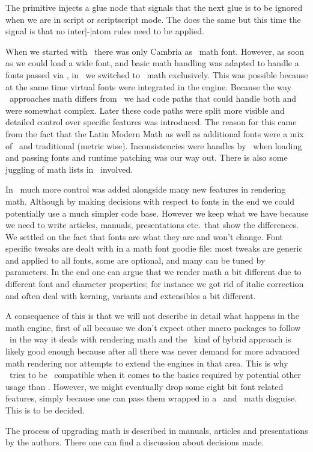 The \type {\nonscript} primitive injects a glue node that signals that the next
glue is to be ignored when we are in script or scriptscript mode. The \typ
{\noatomruling} does the same but this time the signal is that no inter|-|atom
rules need to be applied.

\stopsection

\startsection[title={Fonts}]

When we started with \LUATEX\ there was only Cambria as \OPENTYPE\ math font.
However, as soon as we could load a wide font, and basic math handling was
adapted to handle a fonts passed via \LUA, in \CONTEXT\ we switched to \OPENTYPE\
math exclusively. This was possible because at the same time virtual fonts were
integrated in the engine. Because the way \TEX\ approaches math differs from
\OPENTYPE\ we had code paths that could handle both and were somewhat complex.
Later these code paths were split more visible and detailed control over specific
features was introduced. The reason for this came from the fact that the Latin
Modern Math as well as additional fonts were a mix of \OPENTYPE\ and traditional
(metric wise). Inconsistencies were handles by \CONTEXT\ when loading and passing
fonts and runtime patching was our way out. There is also some juggling of math
lists in \LUA\ involved.

In \LUAMETATEX\ much more control was added alongside many new features in
rendering math. Although by making decisions with respect to fonts in the end we
could potentially use a much simpler code base. However we keep what we have
because we need to write articles, manuals, presentations etc.\ that show the
differences. We settled on the fact that fonts are what they are and won't
change. Font specific tweaks are dealt with in a math font goodie file: most
tweaks are generic and applied to all fonts, some are optional, and many can be
tuned by parameters. In the end one can argue that we render math a bit different
due to different font and character properties; for instance we got rid of italic
correction and often deal with kerning, variants and extensibles a bit different.

A consequence of this is that we will not describe in detail what happens in the
math engine, first of all because we don't expect other macro packages to follow
\CONTEXT\ in the way it deals with rendering math and the \LUATEX\ kind of hybrid
approach is likely good enough because after all there was never demand for more
advanced math rendering nor attempts to extend the engines in that area. This is
why \LUAMETATEX\ tries to be \LUATEX\ compatible when it comes to the basics
required by potential other usage than \CONTEXT. However, we might eventually
drop some eight bit font related features, simply because one can pass them
wrapped in a \UNICODE\ and \OPENTYPE\ math disguise. This is to be decided.

The process of upgrading math is described in manuals, articles and presentations
by the authors. There one can find a discussion about decisions made.

\stopsection

\stopdocument

